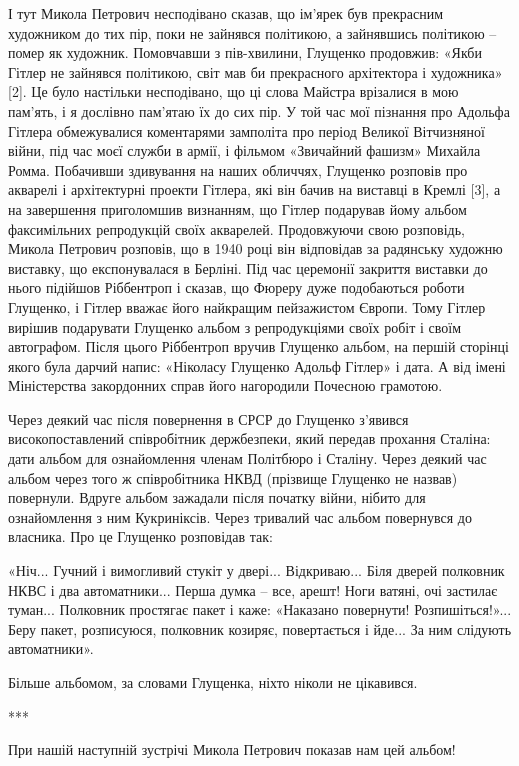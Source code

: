 І тут Микола Петрович несподівано сказав, що ім'ярек був прекрасним художником
до тих пір, поки не зайнявся політикою, а зайнявшись політикою – помер як
художник. Помовчавши з пів-хвилини, Глущенко продовжив: «Якби Гітлер не
зайнявся політикою, світ мав би прекрасного архітектора і художника» [2]. Це
було настільки несподівано, що ці слова Майстра врізалися в мою пам'ять, і я
дослівно пам'ятаю їх до сих пір. У той час мої пізнання про Адольфа Гітлера
обмежувалися коментарями замполіта про період Великої Вітчизняної війни, під
час моєї служби в армії, і фільмом «Звичайний фашизм» Михайла Ромма. Побачивши
здивування на наших обличчях, Глущенко розповів про акварелі і архітектурні
проекти Гітлера, які він бачив на виставці в Кремлі [3], а на завершення
приголомшив визнанням, що Гітлер подарував йому альбом факсимільних репродукцій
своїх акварелей. Продовжуючи свою розповідь, Микола Петрович розповів, що в
1940 році він відповідав за радянську художню виставку, що експонувалася в
Берліні. Під час церемонії закриття виставки до нього підійшов Ріббентроп і
сказав, що Фюреру дуже подобаються роботи Глущенко, і Гітлер вважає його
найкращим пейзажистом Європи. Тому Гітлер вирішив подарувати Глущенко альбом з
репродукціями своїх робіт і своїм автографом. Після цього Ріббентроп вручив
Глущенко альбом, на першій сторінці якого була дарчий напис: «Ніколасу Глущенко
Адольф Гітлер» і дата. А від імені Міністерства закордонних справ його
нагородили Почесною грамотою.

Через деякий час після повернення в СРСР до Глущенко з'явився високопоставлений
співробітник держбезпеки, який передав прохання Сталіна: дати альбом для
ознайомлення членам Політбюро і Сталіну. Через деякий час альбом через того ж
співробітника НКВД (прізвище Глущенко не назвав) повернули. Вдруге альбом
зажадали після початку війни, нібито для ознайомлення з ним Кукриніксів. Через
тривалий час альбом повернувся до власника. Про це Глущенко розповідав так:

«Ніч... Гучний і вимогливий стукіт у двері... Відкриваю... Біля дверей
полковник НКВС і два автоматники... Перша думка – все, арешт! Ноги ватяні, очі
застилає туман... Полковник простягає пакет і каже: «Наказано повернути!
Розпишіться!»... Беру пакет, розписуюся, полковник козиряє, повертається і
йде... За ним слідують автоматники».

Більше альбомом, за словами Глущенка, ніхто ніколи не цікавився.

***

При нашій наступній зустрічі Микола Петрович показав нам цей альбом!

